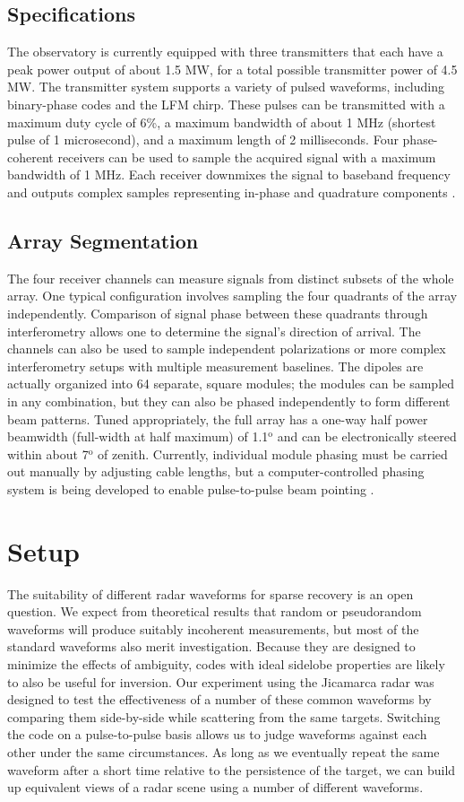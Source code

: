 \subsection{Specifications}
The observatory is currently equipped with three transmitters that each have a peak power output of about 1.5 MW, for a total possible transmitter power of 4.5 MW. The transmitter system supports a variety of pulsed waveforms, including binary-phase codes and the LFM chirp. These pulses can be transmitted with a maximum duty cycle of 6\%, a maximum bandwidth of about 1 MHz (shortest pulse of 1 microsecond), and a maximum length of 2 milliseconds. Four phase-coherent receivers can be used to sample the acquired signal with a maximum bandwidth of 1 MHz. Each receiver downmixes the signal to baseband frequency and outputs complex samples representing in-phase and quadrature components \autocite{JICAMARCA_SPEC}.

\subsection{Array Segmentation}
The four receiver channels can measure signals from distinct subsets of the whole array. One typical configuration involves sampling the four quadrants of the array independently. Comparison of signal phase between these quadrants through interferometry allows one to determine the signal's direction of arrival. The channels can also be used to sample independent polarizations or more complex interferometry setups with multiple measurement baselines. The dipoles are actually organized into 64 separate, square modules; the modules can be sampled in any combination, but they can also be phased independently to form different beam patterns. Tuned appropriately, the full array has a one-way half power beamwidth (full-width at half maximum) of 1.1$^\text{o}$ and can be electronically steered within about 7$^\text{o}$ of zenith. Currently, individual module phasing must be carried out manually by adjusting cable lengths, but a computer-controlled phasing system is being developed to enable pulse-to-pulse beam pointing \autocite{JICAMARCA_SPEC}.

\section{Setup}
The suitability of different radar waveforms for sparse recovery is an open question. We expect from theoretical results that random or pseudorandom waveforms will produce suitably incoherent measurements, but most of the standard waveforms also merit investigation. Because they are designed to minimize the effects of ambiguity, codes with ideal sidelobe properties are likely to also be useful for inversion. Our experiment using the Jicamarca radar was designed to test the effectiveness of a number of these common waveforms by comparing them side-by-side while scattering from the same targets. Switching the code on a pulse-to-pulse basis allows us to judge waveforms against each other under the same circumstances. As long as we eventually repeat the same waveform after a short time relative to the persistence of the target, we can build up equivalent views of a radar scene using a number of different waveforms.

